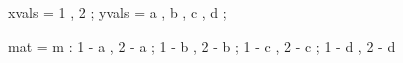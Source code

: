 xvals = 1 , 2 ;
yvals = a , b , c , d ;

% 
%
mat = m : 1 - a , 2 - a ; 
          1 - b , 2 - b ; 
          1 - c , 2 - c ; 
          1 - d , 2 - d
